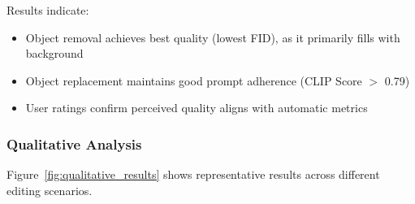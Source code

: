 Results indicate:
\begin{itemize}
    \item Object removal achieves best quality (lowest FID), as it primarily fills with background
    \item Object replacement maintains good prompt adherence (CLIP Score $>$ 0.79)
    \item User ratings confirm perceived quality aligns with automatic metrics
\end{itemize}

\subsubsection{Qualitative Analysis}

Figure~\ref{fig:qualitative_results} shows representative results across different editing scenarios.

